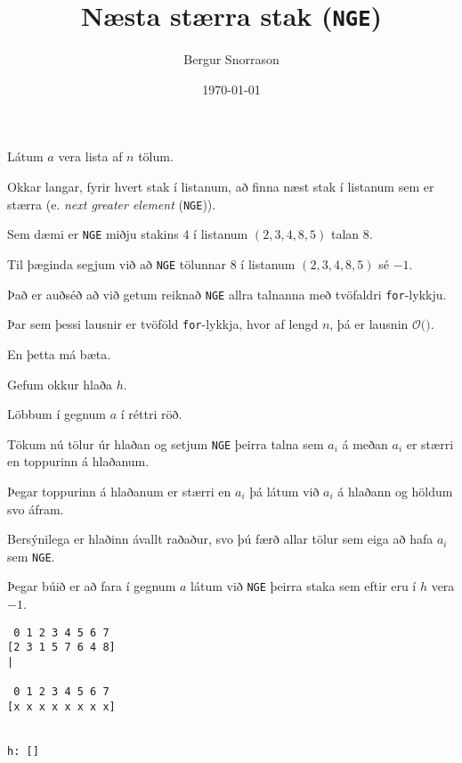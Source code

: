\title{Næsta stærra stak (\texttt{NGE})}
\author{Bergur Snorrason}
\date{\today}



\frame{\titlepage}

{
	{
		\item<1-> Látum $a$ vera lista af $n$ tölum.
		\item<2-> Okkar langar, fyrir hvert stak í listanum, að finna næst stak í listanum sem er stærra (e. \emph{next greater element} (\texttt{NGE})).
		\item<3-> Sem dæmi er \texttt{NGE} miðju stakins $4$ í listanum $(2, 3, 4, 8, 5)$ talan $8$.
		\item<4-> Til þæginda segjum við að \texttt{NGE} tölunnar $8$ í listanum $(2, 3, 4, 8, 5)$ sé $-1$.
		\item<5-> Það er auðséð að við getum reiknað \texttt{NGE} allra talnanna með tvöfaldri \texttt{for}-lykkju.
	}
}

{
}

{
	{
		\item<1-> Þar sem þessi lausnir er tvöföld \texttt{for}-lykkja, hvor af lengd $n$, þá er lausnin $\mathcal{O}($\onslide<2->{$n^2$}$)$.
		\item<2-> En þetta má bæta.
	}
}

{
	{
		\item<1-> Gefum okkur hlaða $h$. 
		\item<2-> Löbbum í gegnum $a$ í réttri röð.
		\item<3-> Tökum nú tölur úr hlaðan og setjum \texttt{NGE} þeirra talna sem $a_i$ á meðan $a_i$ er stærri en toppurinn á hlaðanum.
		\item<4-> Þegar toppurinn á hlaðanum er stærri en $a_i$ þá látum við $a_i$ á hlaðann og höldum svo áfram.
		\item<5-> Bersýnilega er hlaðinn ávallt raðaður, svo þú færð allar tölur sem eiga að hafa $a_i$ sem \texttt{NGE}.
		\item<6-> Þegar búið er að fara í gegnum $a$ látum við \texttt{NGE} þeirra staka sem eftir eru í $h$ vera $-1$.
	}
}

{ \begin{verbatim}
 0 1 2 3 4 5 6 7
[2 3 1 5 7 6 4 8]
|

 0 1 2 3 4 5 6 7
[x x x x x x x x]


h: []
\end{verbatim} }

